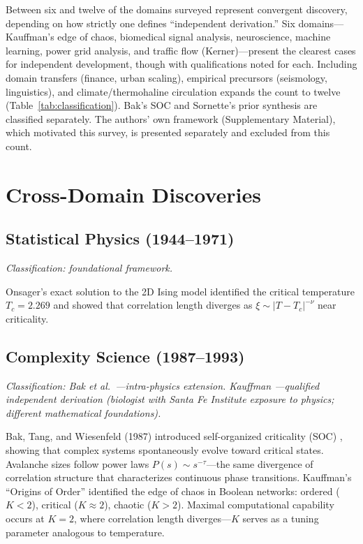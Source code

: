 \documentclass[11pt]{article}
\begin{document}
Between six and twelve of the domains surveyed represent convergent discovery, depending on how strictly one defines ``independent derivation.'' Six domains---Kauffman's edge of chaos, biomedical signal analysis, neuroscience, machine learning, power grid analysis, and traffic flow (Kerner)---present the clearest cases for independent development, though with qualifications noted for each. Including domain transfers (finance, urban scaling), empirical precursors (seismology, linguistics), and climate/thermohaline circulation expands the count to twelve (Table~\ref{tab:classification}). Bak's SOC and Sornette's prior synthesis are classified separately. The authors' own framework (Supplementary Material), which motivated this survey, is presented separately and excluded from this count.

\section{Cross-Domain Discoveries}
\label{sec:discoveries}

\subsection{Statistical Physics (1944--1971)}

\noindent\textit{Classification: foundational framework.}
\smallskip

Onsager's exact solution to the 2D Ising model \citep{onsager1944} identified the critical temperature $T_c = 2.269$ and showed that correlation length diverges as $\xi \sim |T - T_c|^{-\nu}$ near criticality.

\subsection{Complexity Science (1987--1993)}

\noindent\textit{Classification: Bak et al.\ \citep{bak1987}---intra-physics extension. Kauffman \citep{kauffman1993}---qualified independent derivation (biologist with Santa Fe Institute exposure to physics; different mathematical foundations).}
\smallskip

Bak, Tang, and Wiesenfeld (1987) introduced self-organized criticality (SOC) \citep{bak1987}, showing that complex systems spontaneously evolve toward critical states. Avalanche sizes follow power laws $P(s) \sim s^{-\tau}$---the same divergence of correlation structure that characterizes continuous phase transitions. Kauffman's ``Origins of Order'' \citep{kauffman1993} identified the edge of chaos in Boolean networks: ordered ($K < 2$), critical ($K \approx 2$), chaotic ($K > 2$). Maximal computational capability occurs at $K = 2$, where correlation length diverges---$K$ serves as a tuning parameter analogous to temperature.
\end{document}
